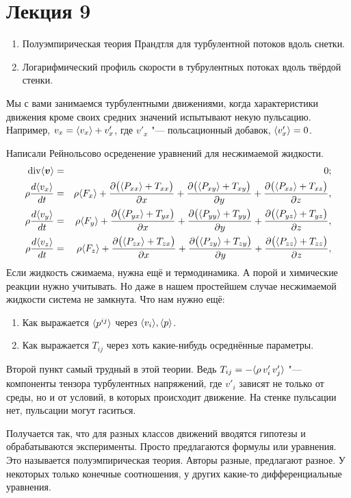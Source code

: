 \section{Лекция 9}
\begin{enumerate}
\item Полуэмпирическая теория Прандтля для турбулентной потоков вдоль снетки.
\item Логарифмический профиль скорости в тубрулентных потоках вдоль твёрдой стенки.
\end{enumerate}
Мы с вами занимаемся турбулентными движениями, когда характеристики движения кроме своих средних значений испытывают некую пульсацию. Например, $v_x = \langle v_x \rangle + v'_x$, где $v'_x$ "--- польсационный добавок, $\langle v'_x \rangle=0$.

Написали Рейнольсово осреденение уравнений для несжимаемой жидкости.
\begin{eqnarray}
  \label{TurboM}\operatorname{div}\langle\boldsymbol{v}\rangle &=&0;\\
  \rho\frac{d\langle v_x \rangle}{dt} &=& \rho\langle F_x \rangle +   \frac{\partial \big(\langle P_{xx} \rangle+T_{xx}\big)}{\partial x} + \frac{\partial \big(\langle P_{xy} \rangle+T_{xy}\big)}{\partial y} + \frac{\partial \big(\langle P_{xz} \rangle+T_{xz}\big)}{\partial z},\\
  \rho\frac{d\langle v_y \rangle}{dt} &=& \rho\langle F_y \rangle +   \frac{\partial \big(\langle P_{yx} \rangle+T_{yx}\big)}{\partial x} + \frac{\partial \big(\langle P_{yy} \rangle+T_{yy}\big)}{\partial y} + \frac{\partial \big(\langle P_{yz} \rangle+T_{yz}\big)}{\partial z},\\
  \rho\frac{d\langle v_z \rangle}{dt} &=& \rho\langle F_z \rangle +   \frac{\partial \big(\langle P_{zx} \rangle+T_{zx}\big)}{\partial x} + \frac{\partial \big(\langle P_{zy} \rangle+T_{zy}\big)}{\partial y} + \frac{\partial \big(\langle P_{zz} \rangle+T_{zz}\big)}{\partial z},\\
\end{eqnarray}
Если жидкость сжимаема, нужна ещё и термодинамика. А порой и химические реакции нужно учитывать. Но даже в нашем простейшем случае несжимаемой жидкости система не замкнута. Что нам нужно ещё:
\begin{enumerate}
\item Как выражается $\langle p^{ij}\rangle$ через $\langle v_i\rangle,\langle p \rangle$.
\item Как выражается $T_{ij}$ через хоть какие-нибудь осреднённые параметры.
\end{enumerate}
Второй пункт самый трудный в этой теории. Ведь $T_{ij} = -\langle \rho\,v'_i\,v'_j \rangle$ "--- компоненты тензора турбулентных напряжений, где $v'_i$ зависят не только от среды, но и от условий, в которых происходит движение. На стенке пульсации нет, пульсации могут гаситься.

Получается так, что для разных классов движений вводятся гипотезы и обрабатываются эксперименты. Просто предлагаются формулы или уравнения. Это называется полуэмпирическая теория. Авторы разные, предлагают разное. У некоторых только конечные соотношения, у других какие-то дифференциальные уравнения.

